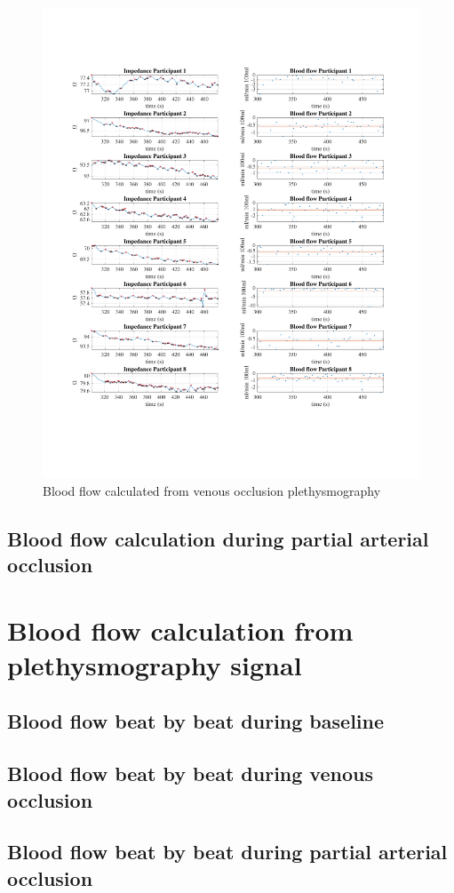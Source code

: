 \begin{figure}
	\includegraphics[width=\textwidth,height=\textheight,keepaspectratio,trim={0.5cm 0.5cm 2cm 2cm},clip]{figure11}    
	\caption{Blood flow calculated from venous occlusion plethysmography}
	\label{fig:blood_flow:venous_occlusion}
\end{figure}

\subsection{Blood flow calculation during partial arterial occlusion}
\label{section5.4.2}

\section{Blood flow calculation from plethysmography signal}
\label{section5.5}
\subsection{Blood flow beat by beat during baseline}
\label{section5.5.1}

\subsection{Blood flow beat by beat during venous occlusion}
\label{section5.5.2}

\subsection{Blood flow beat by beat during partial arterial occlusion}
\label{section5.5.3}
